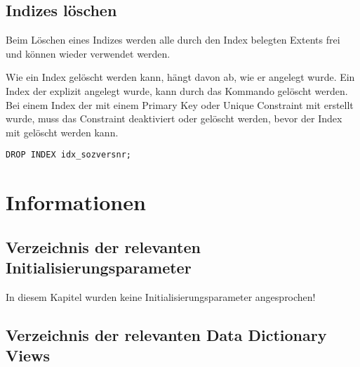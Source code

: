       \subsection{Indizes löschen}
        Beim Löschen eines Indizes werden alle durch den Index belegten Extents frei und können wieder verwendet werden.
				
        Wie ein Index gelöscht werden kann, hängt davon ab, wie er angelegt wurde. Ein Index der explizit angelegt wurde, kann durch das Kommando  gelöscht werden. Bei einem Index der mit einem Primary Key oder Unique Constraint mit erstellt wurde, muss das Constraint deaktiviert oder gelöscht werden, bevor der Index mit  gelöscht werden kann.
        \begin{lstlisting}[caption={Einen Index Löschen},label=admin333,language=oracle_sql]
DROP INDEX idx_sozversnr;
        \end{lstlisting}
\clearpage		
    \section{Informationen}
      \subsection{Verzeichnis der relevanten Initialisierungsparameter}
        In diesem Kapitel wurden keine Initialisierungsparameter angesprochen!
      \subsection{Verzeichnis der relevanten Data Dictionary Views}
        \begin{literaturinternet}
          \item \cite{sthref2545}
          \item \cite{sthref2528}
          \item \cite{sthref2202}
          \item \cite{sthref2191}
        \end{literaturinternet}
